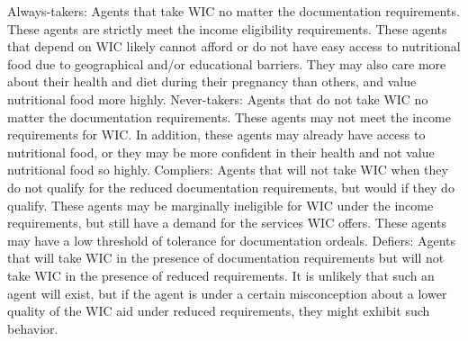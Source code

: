 \documentclass[
]{article}
\begin{document}
\begin{enumerate}
Always-takers: Agents that take WIC no matter the documentation requirements. These agents are strictly meet the income eligibility requirements. These agents that depend on WIC likely cannot afford or do not have easy access to nutritional food due to geographical and/or educational barriers. They may also care more about their health and diet during their pregnancy than others, and value nutritional food more highly. \newline
Never-takers: Agents that do not take WIC no matter the documentation requirements. These agents may not meet the income requirements for WIC. In addition, these agents may already have access to nutritional food, or they may be more confident in their health and not value nutritional food so highly. \newline
Compliers: Agents that will not take WIC when they do not qualify for the reduced documentation requirements, but would if they do qualify. These agents may be marginally ineligible for WIC under the income requirements, but still have a demand for the services WIC offers. These agents may have a low threshold of tolerance for documentation ordeals.\newline
Defiers: Agents that will take WIC in the presence of documentation requirements but will not take WIC in the presence of reduced requirements. It is unlikely that such an agent will exist, but if the agent is under a certain misconception about a lower quality of the WIC aid under reduced requirements, they might exhibit such behavior.  
  

\end{enumerate}
\end{document}
